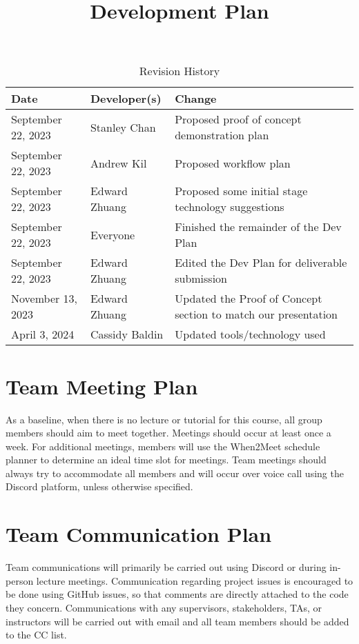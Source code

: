 \documentclass{article}
\title{Development Plan\\\progname}
\author{\authname}
\date{}
\begin{document}
\maketitle

\begin{table}[hp]
\caption{Revision History} \label{TblRevisionHistory}
\begin{tabularx}{\textwidth}{llX}
\toprule
\textbf{Date} & \textbf{Developer(s)} & \textbf{Change}\\
\midrule
September 22, 2023 & Stanley Chan & Proposed proof of concept demonstration plan\\
September 22, 2023 & Andrew Kil & Proposed workflow plan\\
September 22, 2023 & Edward Zhuang & Proposed some initial stage technology suggestions\\
September 22, 2023 & Everyone & Finished the remainder of the Dev Plan\\
September 22, 2023 & Edward Zhuang & Edited the Dev Plan for deliverable submission\\
November 13, 2023 & Edward Zhuang & Updated the Proof of Concept section to match our presentation\\
April 3, 2024 & Cassidy Baldin & Updated tools/technology used\\
\bottomrule
\end{tabularx}
\end{table}


\section{Team Meeting Plan}

As a baseline, when there is no lecture or tutorial for this course, all group members should aim to meet together. Meetings should occur at least once a week. For additional meetings, members will use the When2Meet schedule planner to determine an ideal time slot for meetings. Team meetings should always try to accommodate all members and will occur over voice call using the Discord platform, unless otherwise specified.

\section{Team Communication Plan}

Team communications will primarily be carried out using Discord or during in-person lecture meetings. Communication regarding project issues is encouraged to be done using GitHub issues, so that comments are directly attached to the code they concern. Communications with any supervisors, stakeholders, TAs, or instructors will be carried out with email and all team members should be added to the CC list.
\end{document}
